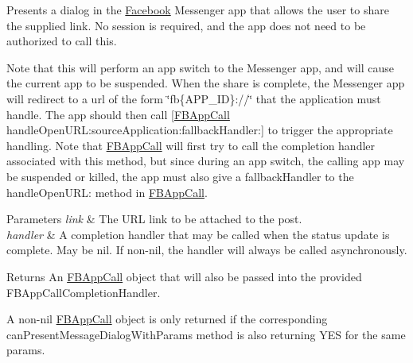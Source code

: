Presents a dialog in the \hyperlink{interfaceFacebook}{Facebook} Messenger app that allows the user to share the supplied link. No session is required, and the app does not need to be authorized to call this.

Note that this will perform an app switch to the Messenger app, and will cause the current app to be suspended. When the share is complete, the Messenger app will redirect to a url of the form \char`\"{}fb\{\+A\+P\+P\+\_\+\+I\+D\}\+://\char`\"{} that the application must handle. The app should then call \mbox{[}\hyperlink{interfaceFBAppCall}{F\+B\+App\+Call} handle\+Open\+U\+R\+L\+:source\+Application\+:fallback\+Handler\+:\mbox{]} to trigger the appropriate handling. Note that \hyperlink{interfaceFBAppCall}{F\+B\+App\+Call} will first try to call the completion handler associated with this method, but since during an app switch, the calling app may be suspended or killed, the app must also give a fallback\+Handler to the handle\+Open\+U\+RL\+: method in \hyperlink{interfaceFBAppCall}{F\+B\+App\+Call}.


\begin{DoxyParams}{Parameters}
{\em link} & The U\+RL link to be attached to the post.\\
\hline
{\em handler} & A completion handler that may be called when the status update is complete. May be nil. If non-\/nil, the handler will always be called asynchronously.\\
\hline
\end{DoxyParams}
\begin{DoxyReturn}{Returns}
An \hyperlink{interfaceFBAppCall}{F\+B\+App\+Call} object that will also be passed into the provided F\+B\+App\+Call\+Completion\+Handler.
\end{DoxyReturn}
A non-\/nil \hyperlink{interfaceFBAppCall}{F\+B\+App\+Call} object is only returned if the corresponding can\+Present\+Message\+Dialog\+With\+Params method is also returning Y\+ES for the same params. \mbox{\label{interfaceFBDialogs_a6441b5e4b196ed9b32180aa14400c05a}} 
